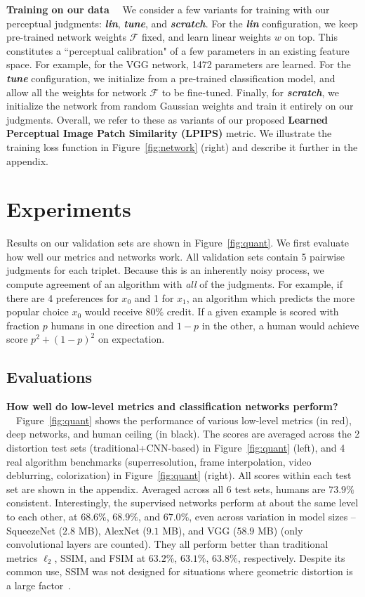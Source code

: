 \textbf{Training on our data} \ \  We consider a few variants for training with our perceptual judgments: \textbf{\textit{lin}}, \textbf{\textit{tune}}, and \textbf{\textit{scratch}}. For the \textbf{\textit{lin}} configuration, we keep pre-trained network weights $\mathcal{F}$ fixed, and learn linear weights $w$ on top. This constitutes a ``perceptual calibration" of a few parameters in an existing feature space. For example, for the VGG network, 1472 parameters are learned. For the \textbf{\textit{tune}} configuration, we initialize from a pre-trained classification model, and allow all the weights for network $\mathcal{F}$ to be fine-tuned. Finally, for \textbf{\textit{scratch}}, we initialize the network from random Gaussian weights and train it entirely on our judgments. Overall, we refer to these as variants of our proposed \textbf{Learned Perceptual Image Patch Similarity (LPIPS)} metric. We illustrate the training loss function in Figure~\ref{fig:network} (right) and describe it further in the appendix.

\section{Experiments}

Results on our validation sets are shown in Figure~\ref{fig:quant}. We first evaluate how well our metrics and networks work. All validation sets contain 5 pairwise judgments for each triplet. Because this is an inherently noisy process, we compute agreement of an algorithm with \textit{all} of the judgments. For example, if there are 4 preferences for $x_0$ and 1 for $x_1$, an algorithm which predicts the more popular choice $x_0$ would receive $80\%$ credit. If a given example is scored with fraction $p$ humans in one direction and $1-p$ in the other, a human would achieve score $p^2+(1-p)^2$ on expectation.

\subsection{Evaluations}

  \textbf{How well do low-level metrics and classification networks perform?} \ \  Figure~\ref{fig:quant} shows the performance of various low-level metrics (in red), deep networks, and human ceiling (in black). The scores are averaged across the 2 distortion test sets (traditional+CNN-based) in Figure~\ref{fig:quant} (left), and 4 real algorithm benchmarks (superresolution, frame interpolation, video deblurring, colorization) in Figure~\ref{fig:quant} (right). All scores within each test set are shown in the appendix. Averaged across all 6 test sets, humans are $73.9\%$ consistent. Interestingly, the supervised networks perform at about the same level to each other, at $68.6\%$, $68.9\%$, and $67.0\%$, even across variation in model sizes -- SqueezeNet ($2.8$ MB), AlexNet ($9.1$ MB), and VGG ($58.9$ MB) (only convolutional layers are counted). They all perform better than traditional metrics $\ell_2$, SSIM, and FSIM at $63.2\%$, $63.1\%$, $63.8\%$, respectively. Despite its common use, SSIM was not designed for situations where geometric distortion is a large factor~\cite{sampat2009complex}.

